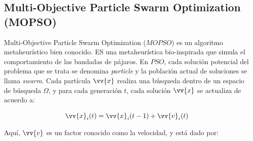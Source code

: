 
\subsection{Multi-Objective Particle Swarm Optimization (MOPSO)}

Multi-Objective Particle Swarm Optimization ($MOPSO$) \cite{nebro2009smpso} es un algoritmo metaheurístico bien conocido. ES una metaheurística bio-inspirada que simula el comportamiento de las bandadas de pájaros. En $PSO$, cada solución potencial del problema que se trata se denomina \textit{particle} y la población actual de soluciones se llama \textit{swarm}. Cada partícula $\vv{x}$ realiza una búsqueda dentro de un espacio de búsqueda $\Omega$, y para cada generación $t$, cada solución $\vv{x}$ se actualiza de acuerdo a: 


\begin{equation}\label{eq:posicion1}
\vv{x}_i(t) = \vv{x}_i(t-1) + \vv{v}_i(t)
\end{equation}



Aquí, $\vv{v}$ es un factor conocido como la velocidad, y está dado por:

